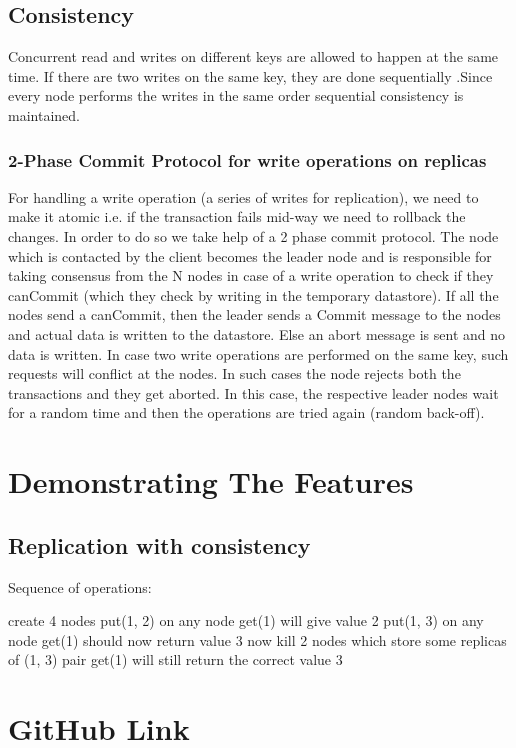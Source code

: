 \documentclass{article}
\begin{document}
\subsection{Consistency}
Concurrent read and writes on different keys are allowed to happen at the same time. If there are two writes on the same key, they are done sequentially .Since every node performs the writes in the same order sequential consistency is maintained. 

\subsubsection{2-Phase Commit Protocol for write operations on replicas}
For handling a write operation (a series of writes for replication), we need to make it atomic i.e. if the transaction fails mid-way we need to rollback the changes. In order to do so we take help of a 2 phase commit protocol. The node which is contacted by the client becomes the leader node and is responsible for taking consensus from the N nodes in case of a write operation to check if they canCommit (which they check by writing in the temporary datastore).  If all the nodes  send a canCommit, then the leader sends a Commit message to the nodes and actual data is written to the datastore. Else an abort message is sent and no data is written. In case two write operations are performed on the same key, such requests will conflict at the nodes. In such cases the node rejects both the transactions and they get aborted. In this case, the respective leader nodes wait for a random time and then the operations are tried again (random back-off).

\section{Demonstrating The Features}

\subsection{Replication with consistency}
Sequence of operations:
\begin{spverbatim}
create 4 nodes
put(1, 2) on any node
get(1) will give value 2
put(1, 3) on any node
get(1) should now return value 3
now kill 2 nodes which store some replicas of (1, 3) pair
get(1) will still return the correct value 3
\end{spverbatim}

\section{GitHub Link}
\end{document}
